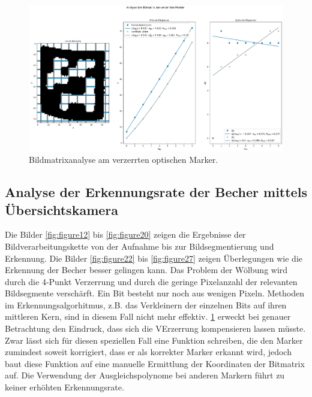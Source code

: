    
    \begin{figure}
        \caption[Bildmatrixanalyse]{\small Bildmatrixanalyse am verzerrten optischen Marker.}\label{fig:figure21}
        \includegraphics[width = \textwidth]{Bilder/cup6_analyse.png}
        \centering
    \end{figure}

    \clearpage
    

    \subsection{Analyse der Erkennungsrate der Becher mittels Übersichtskamera}

    Die Bilder \ref{fig:figure12} bis \ref{fig:figure20} zeigen die Ergebnisse der Bildverarbeitungskette von der Aufnahme bis zur Bildsegmentierung und Erkennung.
    Die Bilder \ref{fig:figure22} bis \ref{fig:figure27} zeigen Überlegungen wie die Erkennung der Becher besser gelingen kann. 
    Das Problem der Wölbung wird durch die 4-Punkt Verzerrung und durch die geringe Pixelanzahl der relevanten Bildsegmente verschärft. 
    Ein Bit besteht nur noch aus wenigen Pixeln. 
    Methoden im Erkennungsalgorhitmus, z.B. das Verkleinern der einzelnen Bits auf ihren mittleren Kern, sind in diesem Fall nicht mehr effektiv. 
    \ref{fig:figure21} erweckt bei genauer Betrachtung den Eindruck, dass sich die VErzerrung kompensieren lassen müsste. 
    Zwar lässt sich für diesen speziellen Fall eine Funktion schreiben, die den Marker zumindest soweit korrigiert, dass er als korrekter Marker erkannt wird, jedoch baut diese Funktion
    auf eine manuelle Ermittlung der Koordinaten der Bitmatrix auf. 
    Die Verwendung der Ausgleichspolynome bei anderen Markern führt zu keiner erhöhten Erkennungsrate. 

